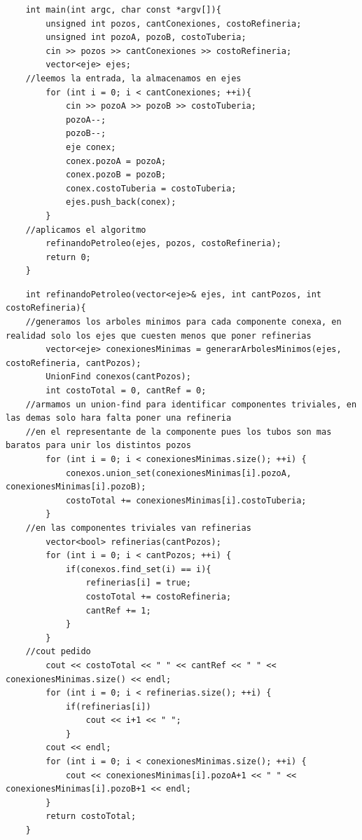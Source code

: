 	\begin{codesnippet}
	\begin{verbatim}
    int main(int argc, char const *argv[]){
        unsigned int pozos, cantConexiones, costoRefineria;
        unsigned int pozoA, pozoB, costoTuberia;
        cin >> pozos >> cantConexiones >> costoRefineria;
        vector<eje> ejes;
    //leemos la entrada, la almacenamos en ejes
        for (int i = 0; i < cantConexiones; ++i){
            cin >> pozoA >> pozoB >> costoTuberia;
            pozoA--;
            pozoB--;
            eje conex;
            conex.pozoA = pozoA;
            conex.pozoB = pozoB;
            conex.costoTuberia = costoTuberia;
            ejes.push_back(conex);
        }
    //aplicamos el algoritmo
        refinandoPetroleo(ejes, pozos, costoRefineria);
        return 0;
    }
	\end{verbatim}
	\end{codesnippet}

	\begin{codesnippet}
	\begin{verbatim}
    int refinandoPetroleo(vector<eje>& ejes, int cantPozos, int costoRefineria){
    //generamos los arboles minimos para cada componente conexa, en realidad solo los ejes que cuesten menos que poner refinerias
        vector<eje> conexionesMinimas = generarArbolesMinimos(ejes, costoRefineria, cantPozos);
        UnionFind conexos(cantPozos);
        int costoTotal = 0, cantRef = 0;
    //armamos un union-find para identificar componentes triviales, en las demas solo hara falta poner una refineria
    //en el representante de la componente pues los tubos son mas baratos para unir los distintos pozos
        for (int i = 0; i < conexionesMinimas.size(); ++i) {
            conexos.union_set(conexionesMinimas[i].pozoA, conexionesMinimas[i].pozoB);
            costoTotal += conexionesMinimas[i].costoTuberia;
        }
    //en las componentes triviales van refinerias
        vector<bool> refinerias(cantPozos);
        for (int i = 0; i < cantPozos; ++i) {
            if(conexos.find_set(i) == i){
                refinerias[i] = true;
                costoTotal += costoRefineria;
                cantRef += 1;
            }
        }
    //cout pedido
        cout << costoTotal << " " << cantRef << " " << conexionesMinimas.size() << endl;
        for (int i = 0; i < refinerias.size(); ++i) {
            if(refinerias[i])
                cout << i+1 << " ";
            }
        cout << endl;
        for (int i = 0; i < conexionesMinimas.size(); ++i) {
            cout << conexionesMinimas[i].pozoA+1 << " " << conexionesMinimas[i].pozoB+1 << endl;
        }
        return costoTotal;
    }
	\end{verbatim}
	\end{codesnippet}

